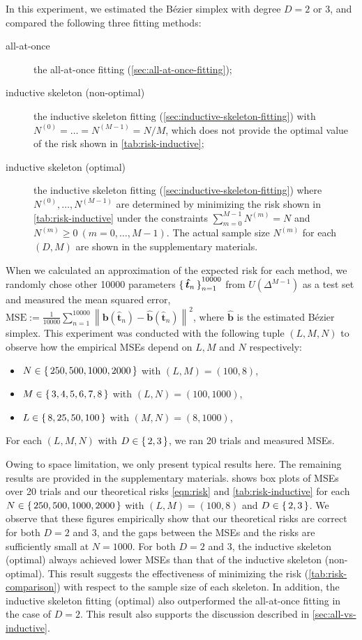 \documentclass[letterpaper]{article} %
\theoremstyle{plain}
\newcommand{\norm}[1]{\left\| #1 \right\|}
\begin{document}
In this experiment, we estimated the B\'ezier simplex with degree $D = 2$ or 3, and compared the following three fitting methods:
\begin{description}
    \item[all-at-once] the all-at-once fitting (\cref{sec:all-at-once-fitting});
    \item[inductive skeleton (non-optimal)] the inductive skeleton fitting (\cref{sec:inductive-skeleton-fitting}) with $N^{(0)} = \dots = N^{(M - 1)} = N / M$, which does not provide the optimal value of the risk shown in \cref{tab:risk-inductive};
    \item[inductive skeleton (optimal)] the inductive skeleton fitting (\cref{sec:inductive-skeleton-fitting}) where $N^{(0)}, \dots, N^{(M - 1)}$ are determined by minimizing the risk shown in \cref{tab:risk-inductive} under the constraints $\sum_{m = 0}^{M - 1} N^{(m)} = N$ and $N^{(m)}\geq 0~(m = 0, \dots, M - 1)$. The actual sample size $N^{(m)}$ for each $(D, M)$ are shown in the supplementary materials.%
\end{description}
When we calculated an approximation of the expected risk for each method, we randomly chose other 10000 parameters $\set{\bm{\hat t}_n}_{n = 1}^{10000}$ from $U(\Delta^{M - 1})$ as a test set and measured the mean squared error, $\mathrm{MSE} := \frac{1}{10000} \sum_{n = 1}^{10000} \norm{\bm b(\bm{\hat{t}}_n) - \bm{\hat{b}}(\bm{\hat{t}}_n)}^2$, where $\bm{\hat{b}}$ is the estimated B\'ezier simplex.
This experiment was conducted with the following tuple $(L, M, N)$ to observe how the empirical MSEs depend on $L, M$ and $N$ respectively:
\begin{itemize}
    \item $N \in \set{250, 500, 1000, 2000}$ with $(L, M) = (100, 8)$,
    \item $M \in \set{3,4,5,6,7,8}$ with $(L, N) = (100, 1000)$,
    \item $L \in \set{8, 25, 50, 100}$ with $(M, N) = (8, 1000)$,
\end{itemize}
For each $(L, M, N)$ with $D \in \set{2, 3}$, we ran 20 trials and measured MSEs.

Owing to space limitation, we only present typical results here. The remaining results are provided in the supplementary materials.
 shows box plots of MSEs over 20 trials and our theoretical risks \cref{eqn:risk} and \cref{tab:risk-inductive} for each $N \in \set{250, 500, 1000, 2000}$ with $(L, M) = (100, 8)$ and $D \in \set{2, 3}$.
We observe that these figures empirically show that our theoretical risks are correct for both $D = 2$ and 3, and the gaps between the MSEs and the risks are sufficiently small at $N = 1000$.
For both $D = 2$ and 3, the inductive skeleton (optimal) always achieved lower MSEs than that of the inductive skeleton (non-optimal).
This result suggests the effectiveness of minimizing the risk (\cref{tab:risk-comparison}) with respect to the sample size of each skeleton.
In addition, the inductive skeleton fitting (optimal) also outperformed the all-at-once fitting in the case of $D = 2$.
This result also supports the discussion described in \cref{sec:all-vs-inductive}.
\end{document}
